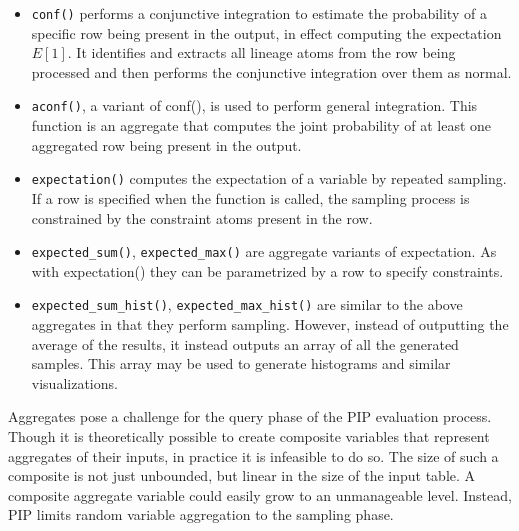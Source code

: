 \begin{itemize}
\item \texttt{conf()} performs a conjunctive integration to estimate the probability of a specific row being present in the output, in effect computing the expectation $E[1]$.  It identifies and extracts all lineage atoms from the row being processed and then performs the conjunctive integration over them as normal.

\item \texttt{aconf()}, a variant of conf(), is used to perform general integration.  This function is an aggregate that computes the joint probability of at least one aggregated row being present in the output.  

\item \texttt{expectation()} computes the expectation of a variable by repeated sampling.  If a row is specified when the function is called, the sampling process is constrained by the constraint atoms present in the row.

\item \texttt{expected\_sum()}, \texttt{expected\_max()} are aggregate variants of expectation.  As with expectation() they can be parametrized by a row to specify constraints.

\item \texttt{expected\_sum\_hist()}, \texttt{expected\_max\_hist()} are similar to the above aggregates in that they perform sampling.  However, instead of outputting the average of the results, it instead outputs an array of all the generated samples.  This array may be used to generate histograms and similar visualizations.
\end{itemize}

Aggregates pose a challenge for the query phase of the PIP evaluation process.  Though it is theoretically possible to create composite variables that represent aggregates of their inputs, in practice it is infeasible to do so.  The size of such a composite is not just unbounded, but linear in the size of the input table.  A composite aggregate variable could easily grow to an unmanageable level.  Instead, PIP limits random variable aggregation to the sampling phase.  


